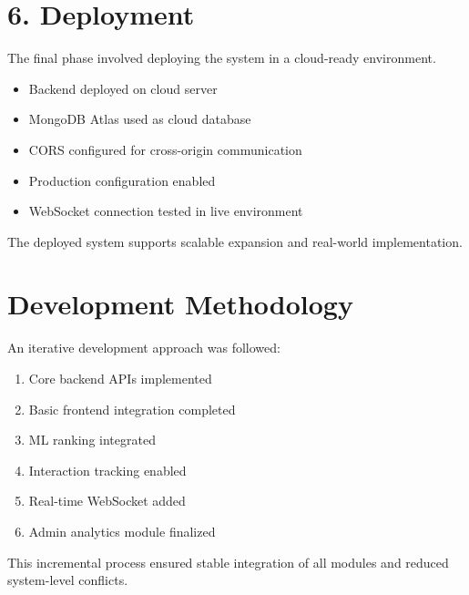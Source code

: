 \documentclass[12pt,a4paper]{report}
\begin{document}
\section{6. Deployment}

The final phase involved deploying the system in a cloud-ready environment.

\begin{itemize}

\item Backend deployed on cloud server

\item MongoDB Atlas used as cloud database

\item CORS configured for cross-origin communication

\item Production configuration enabled

\item WebSocket connection tested in live environment

\end{itemize}

The deployed system supports scalable expansion and real-world implementation.

\section{Development Methodology}

An iterative development approach was followed:

\begin{enumerate}

\item Core backend APIs implemented

\item Basic frontend integration completed

\item ML ranking integrated

\item Interaction tracking enabled

\item Real-time WebSocket added

\item Admin analytics module finalized

\end{enumerate}

This incremental process ensured stable integration of all modules and reduced system-level conflicts.
\end{document}
